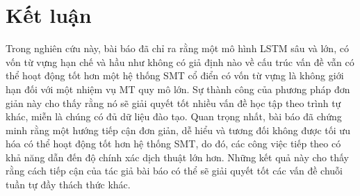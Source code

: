 \section{Kết luận}

Trong nghiên cứu này, bài báo đã chỉ ra rằng một mô hình LSTM sâu và lớn, có vốn từ vựng hạn chế và hầu như không có giả định nào về cấu trúc vấn đề vẫn có thể hoạt động tốt hơn một hệ thống SMT cổ điển có vốn từ vựng là không giới hạn đối với một nhiệm vụ MT quy mô lớn. Sự thành công của phương pháp đơn giản này cho thấy rằng nó sẽ giải quyết tốt nhiều vấn đề học tập theo trình tự khác, miễn là chúng có đủ dữ liệu đào tạo.
Quan trọng nhất, bài báo đã chứng minh rằng một hướng tiếp cận đơn giản, dễ hiểu và tương đối không được tối ưu hóa có thể hoạt động tốt hơn hệ thống SMT, do đó, các công việc tiếp theo có khả năng dẫn đến độ chính xác dịch thuật lớn hơn. Những kết quả này cho thấy rằng cách tiếp cận của tác giả bài báo có thể sẽ giải quyết tốt các vấn đề chuỗi tuần tự đầy thách thức khác.
